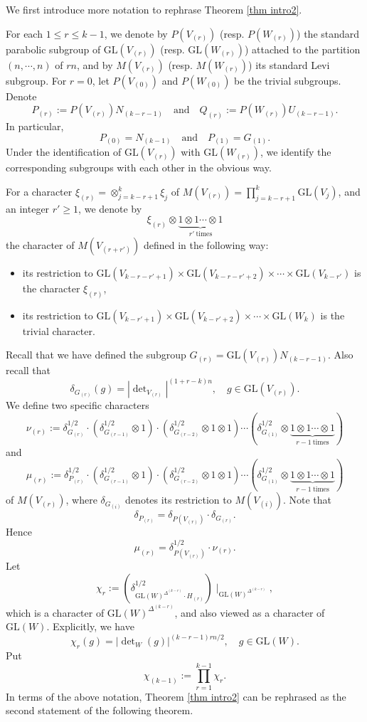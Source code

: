 \documentclass[11pt,reqno]{amsart}
\renewcommand{\1}{{\mathbf{1}}} \newcommand{\sB}{{\mathscr{B}}}
\newcommand{\GL}{{\mathrm{GL}}}\newcommand{\G}{{\mathrm{G}}}
\theoremstyle{plain}
\theoremstyle{definition}
\numberwithin{equation}{section}
\begin{document}
We first introduce more notation to rephrase Theorem \ref{thm intro2}.

For each $1\leq r\leq k-1$, we denote by $P(V_{(r)})$ (resp. $P(W_{(r)})$) the standard parabolic subgroup of $\GL(V_{(r)})$ (resp. $\GL(W_{(r)})$) attached to the partition $(n,\cdots,n)$ of $rn$, and by $M(V_{(r)})$ (resp. $M(W_{(r)})$) its standard Levi subgroup.  For $r=0$, let $P(V_{(0)})$ and $P(W_{(0)})$ be the trivial subgroups.  Denote
$$
P_{(r)}:=P(V_{(r)})N_{(k-r-1)}\quad\textrm{and}\quad Q_{(r)}:=P(W_{(r)})U_{(k-r-1)}.$$ 
In particular, $$P_{(0)}=N_{(k-1)}\quad\textrm{and}\quad P_{(1)}=G_{(1)}.$$
Under the identification of $\GL(V_{(r)})$ with $\GL(W_{(r)})$, we identify the corresponding subgroups with each other in the obvious way.

For  a character  $\xi_{(r)}=\otimes_{j=k-r+1}^k\xi_j$ of $M(V_{(r)})=\prod_{j=k-r+1}^k\GL(V_j)$, and an integer $r'\geq1$, we denote by
$$\xi_{(r)}\otimes \underbrace{1\otimes1\cdots\otimes1}_{r'\ \textrm{times}}$$ the character of $M(V_{(r+r')})$ defined in the following way:
\begin{itemize}
\item its restriction to $\GL(V_{k-r-r'+1})\times\GL(V_{k-r-r'+2})\times\cdots\times\GL(V_{k-r'})$ is the character $\xi_{(r)}$,
\item its restriction to $\GL(V_{k-r'+1})\times\GL(V_{k-r'+2})\times\cdots\times\GL(W_k)$ is the trivial character.
\end{itemize}

Recall that we have defined the subgroup  $G_{(r)}=\GL(V_{(r)})N_{(k-r-1)}$. Also
recall that $$\delta_{G_{(r)}}(g)=|\det\nolimits_{V_{(r)}}|^{(1+r-k)n},\quad g\in\GL(V_{(r)}).$$
We define two specific characters
$$\nu_{(r)}:=\delta_{G_{(r)}}^{1/2}\cdot(\delta^{1/2}_{G_{(r-1)}}\otimes 1)\cdot(\delta^{1/2}_{G_{(r-2)}}\otimes1\otimes1)\cdots(\delta^{1/2}_{G_{(1)}}\otimes \underbrace{1\otimes1\cdots\otimes1}_{r-1\ \textrm{times}})$$ and
$$\mu_{(r)}:=\delta_{P_{(r)}}^{1/2}\cdot(\delta^{1/2}_{G_{(r-1)}}\otimes 1)\cdot(\delta^{1/2}_{G_{(r-2)}}\otimes1\otimes1)\cdots(\delta^{1/2}_{G_{(1)}}\otimes \underbrace{1\otimes1\cdots\otimes1}_{r-1\ \textrm{times}})$$ of $M(V_{(r)})$, where $\delta_{G_{(i)}}$ denotes its restriction to $M(V_{(i)})$.
Note that
\begin{equation}\label{equ char-relation1}\delta_{P_{(r)}}=\delta_{P(V_{(r)})}\cdot\delta_{G_{(r)}}.\end{equation}
Hence 
\begin{equation}\label{equ char-relation2}\mu_{(r)}=\delta_{P(V_{(r)})}^{1/2}\cdot\nu_{(r)}.\end{equation}
Let
$$\chi_r:=\left(\delta^{1/2}_{\GL(W)^{\Delta^{(k-r)}}\cdot H_{(r)}}\right)\mid_{\GL(W)^{\Delta^{(k-r)}}},$$ which is a character of  $\GL(W)^{\Delta^{(k-r)}}$, and also viewed as a character of $\GL(W)$. Explicitly, we have
$$\chi_r(g)=|\det\nolimits_W(g)|^{(k-r-1)rn/2},\quad g\in\GL(W).$$ Put
$$\chi_{(k-1)}:=\prod_{r=1}^{k-1}\chi_r.$$
In terms of the above notation, Theorem \ref{thm intro2} can be rephrased as the second statement of the following theorem. 
\end{document}
